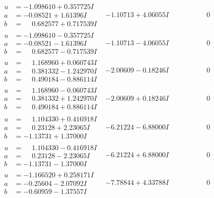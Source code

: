 \documentclass[1p]{elsarticle_modified}
\theoremstyle{definition}
\begin{document}
$$\begin{array}{c|c|c}
\begin{aligned}
u &= -1.098610 + 0.357725 I \\
a &= -0.08521 + 1.61396 I \\
b &= \phantom{-}0.682577 + 0.717539 I\end{aligned}
 & -1.10713 + 4.06055 I & \phantom{-0.000000 } 0 \\ \hline\begin{aligned}
u &= -1.098610 - 0.357725 I \\
a &= -0.08521 - 1.61396 I \\
b &= \phantom{-}0.682577 - 0.717539 I\end{aligned}
 & -1.10713 - 4.06055 I & \phantom{-0.000000 } 0 \\ \hline\begin{aligned}
u &= \phantom{-}1.168960 + 0.060743 I \\
a &= \phantom{-}0.381332 - 1.242970 I \\
b &= \phantom{-}0.490184 - 0.886114 I\end{aligned}
 & -2.00609 - 0.18246 I & \phantom{-0.000000 } 0 \\ \hline\begin{aligned}
u &= \phantom{-}1.168960 - 0.060743 I \\
a &= \phantom{-}0.381332 + 1.242970 I \\
b &= \phantom{-}0.490184 + 0.886114 I\end{aligned}
 & -2.00609 + 0.18246 I & \phantom{-0.000000 } 0 \\ \hline\begin{aligned}
u &= \phantom{-}1.104330 + 0.416918 I \\
a &= \phantom{-}0.23128 + 2.23065 I \\
b &= -1.13731 + 1.37000 I\end{aligned}
 & -6.21224 - 6.88000 I & \phantom{-0.000000 } 0 \\ \hline\begin{aligned}
u &= \phantom{-}1.104330 - 0.416918 I \\
a &= \phantom{-}0.23128 - 2.23065 I \\
b &= -1.13731 - 1.37000 I\end{aligned}
 & -6.21224 + 6.88000 I & \phantom{-0.000000 } 0 \\ \hline\begin{aligned}
u &= -1.166520 + 0.258171 I \\
a &= -0.25604 - 2.07092 I \\
b &= -0.60959 - 1.37557 I\end{aligned}
 & -7.78844 + 4.33788 I & \phantom{-0.000000 } 0 \\ \hline\begin{aligned}

\end{aligned}
\end{array}$$
\end{document}
